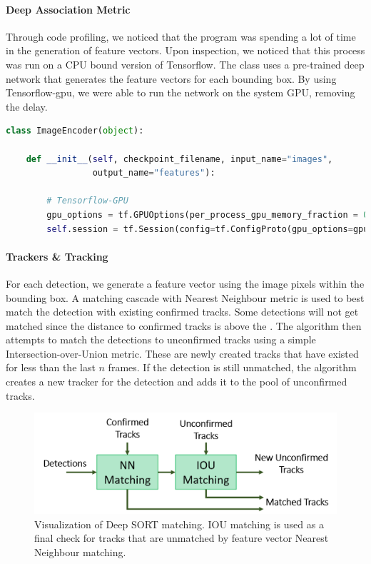 \paragraph{Deep Association Metric} Through code profiling, we noticed that the program was spending a lot of time in the generation of feature vectors. Upon inspection, we noticed that this process was run on a CPU bound version of Tensorflow. The  class uses a pre-trained deep network that generates the feature vectors for each bounding box. By using Tensorflow-gpu, we were able to run the network on the system GPU, removing the delay. \\

\begin{lstlisting}[language=Python, caption={Deep SORT Tensorflow GPU modifications.}]
class ImageEncoder(object):

    def __init__(self, checkpoint_filename, input_name="images",
                 output_name="features"):
                 
        # Tensorflow-GPU
        gpu_options = tf.GPUOptions(per_process_gpu_memory_fraction = 0.2)
        self.session = tf.Session(config=tf.ConfigProto(gpu_options=gpu_options))
\end{lstlisting}

\paragraph{Trackers \& Tracking} For each detection, we generate a feature vector using the image pixels within the bounding box. A matching cascade with Nearest Neighbour metric is used to best match the detection with existing confirmed tracks. Some detections will not get matched since the distance to confirmed tracks is above the . The algorithm then attempts to match the detections to unconfirmed tracks using a simple Intersection-over-Union metric. These are newly created tracks that have existed for less than the last $n$ frames. If the detection is still unmatched, the algorithm creates a new tracker for the detection and adds it to the pool of unconfirmed tracks.

\begin{figure}[ht]
    \centering
    \includegraphics[width=0.8\linewidth]{img/chapter5_implementation/deepSortMatching.png}
    \caption{Visualization of Deep SORT matching. IOU matching is used as a final check for tracks that are unmatched by feature vector Nearest Neighbour matching.}
    \label{fig:deepSortMatch}
\end{figure}

